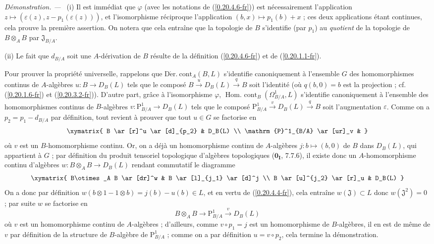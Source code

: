 \documentclass[10pt,oneside]{book}
\newcommand{\sref}[1]{(\ref{#1})}
\newcommand{\oldpage}[2][]{%
  \setcounter{footnote}{0}%
  \marginpar{\scriptsize\textbf{#1}~|~#2}\ignorespaces}
\newenvironment{proof}{%
  \par\medskip\noindent\textit{Démonstration. ---\ }}{\par}
\begin{document}
\begin{proof}
\oldpage[0\textsubscript{IV-1}]{126}
(i) Il est immédiat que $\varphi$ (avec les notations de
\sref{0.20.4.6-fr}) est nécessairement l'application
$z\mapsto(\varepsilon(z),z-p_1(\varepsilon(z)))$, et l'isomorphisme
réciproque l'application $(b,x)\mapsto p_1(b)+x$ ; ces deux applications
étant continues, cela prouve la première assertion. On notera que cela
entraîne que la topologie de $B$ s'identifie (par $p_1$) au \emph{quotient}
de la topologie de $B\otimes_A B$ par $\mathfrak{J}_{B/A}$.

(ii) Le fait que $d_{B/A}$ soit une $A$-dérivation de $B$ résulte de la
définition \sref{0.20.4.6-fr} et de \sref{0.20.1.1-fr}.

Pour prouver la propriété universelle, rappelons que
$\operatorname{D\acute{e}r.\ cont}_A(B,L)$ s'identifie canoniquement à
l'ensemble $G$ des homomorphismes continus de $A$-algèbres
$u:B\to D_B(L)$ tels que le composé
$B\xrightarrow{u}D_B(L)\xrightarrow{q}B$ soit l'identité (où $q(b,0)=b$ est
la projection ; cf. \sref{0.20.1.6-fr} et \sref{0.20.3.2-fr}). D'autre part,
grâce à l'isomorphisme $\varphi$,
$\operatorname{Hom.\ cont}_B(\Omega^1_{B/A},L)$ s'identifie canoniquement à
l'ensemble des homomorphismes continus de $B$-algèbres
$v:\mathrm{P}^1_{B/A}\to D_B(L)$ tels que le composé
$\mathrm{P}^1_{B/A}\xrightarrow{v}D_B(L)\xrightarrow{q}B$ soit
l'augmentation $\varepsilon$. Comme on a $p_2=p_1-d_{B/A}$ par définition,
tout revient à prouver que tout $u\in G$ se factorise en
\[
\xymatrix{
  B \ar[r]^u \ar[d]_{p_2} & D_B(L) \\
  \mathrm{P}^1_{B/A} \ar[ur]_v &
}
\]
où $v$ est un $B$-homomorphisme continu. Or, on a déjà un homomorphisme
continu de $A$-algèbres $j:b\mapsto(b,0)$ de $B$ dans $D_B(L)$, qui
appartient à $G$ ; par définition du produit tensoriel topologique
d'algèbres topologiques ($\mathbf{0_I}$, 7.7.6), il existe donc un
$A$-homomorphisme continu d'algèbres
$w:B\otimes_A B\to D_B(L)$ rendant commutatif le diagramme
\[
\xymatrix{
  B\otimes_A B \ar[dr]^w & B \ar[l]_{j_1} \ar[d]^j \\
  B \ar[u]^{j_2} \ar[r]_u & D_B(L)
}
\]
On a donc par définition
$w(b\otimes1-1\otimes b)=j(b)-u(b)\in L$, et en vertu de
\sref{0.20.4.4-fr}, cela entraîne $w(\mathfrak{J})\subset L$ donc
$w(\mathfrak{J}^2)=0$ ; par suite $w$ se factorise en
\[
  B\otimes_A B\to\mathrm{P}^1_{B/A}\xrightarrow{v}D_B(L)
\]
où $v$ est un homomorphisme continu de $A$-algèbres ; d'ailleurs, comme
$v\circ p_1=j$ est un homomorphisme de $B$-algèbres, il en est de même de
$v$ par définition de la structure de $B$-algèbre de
$\mathrm{P}^1_{B/A}$ ; comme on a par définition $u=v\circ p_2$, cela
termine la démonstration.
\end{proof}
\end{document}
